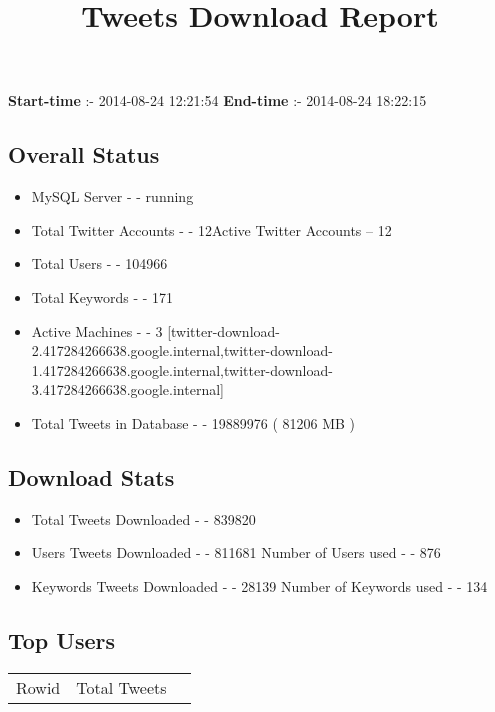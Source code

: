 \documentclass{article}\usepackage[T1]{fontenc}
\begin{document}
\title{\textbf{Tweets Download Report}}
               \date{}
                \maketitle
               \centerline{\textbf{Start-time} :- 2014-08-24 12:21:54 \hspace{40pt} \textbf{End-time} :- 2014-08-24 18:22:15}               \subsection*{Overall Status}                \begin{itemize}                \item MySQL Server - - running               \item Total Twitter Accounts - - 12\newline Active Twitter Accounts -- 12               \item Total Users - - 104966               \item Total Keywords - - 171               \item Active Machines - - 3 [twitter-download-2.417284266638.google.internal,twitter-download-1.417284266638.google.internal,twitter-download-3.417284266638.google.internal]               \item Total Tweets in Database - - 19889976 ( 81206 MB )               \end{itemize}               \subsection*{Download Stats}                \begin{itemize}                \item Total Tweets Downloaded - - 839820               \item Users Tweets Downloaded - - 811681 \newline Number of Users used - - 876               \item Keywords Tweets Downloaded - - 28139 \newline Number of Keywords used - - 134              \end{itemize}              \subsection*{Top Users}\begin{tabular}{|c|c|c|}         \hline         Rowid & Total Tweets \\ 

\end{tabular}
\end{document}
